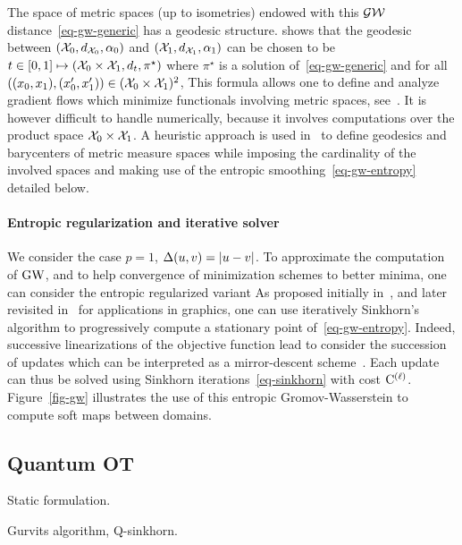 \begin{rem}
The space of metric spaces (up to isometries) endowed with this $\operatorname{\mathcal{GW}}$ distance~\eqref{eq-gw-generic} has a geodesic structure. \cite{SturmGW} shows that the geodesic between  $(\mathcal{X}_0,d_{\mathcal{X}_0},\alpha_0)$ and $(\mathcal{X}_1,d_{\mathcal{X}_1},\alpha_1)$ can be chosen to be 
$t \in [0,1] \mapsto (\mathcal{X}_0 \times \mathcal{X}_1,d_t,\pi^\star)$ where $\pi^\star$ is a solution of~\eqref{eq-gw-generic} and for all $((x_0,x_1), (x_0',x_1')) \in (\mathcal{X}_0 \times \mathcal{X}_1)^2$, 
This formula allows one to define and analyze gradient flows which minimize functionals involving metric spaces, see~\cite{SturmGW}. It is however difficult to handle numerically, because it involves computations over the product space $\mathcal{X}_0 \times \mathcal{X}_1$. 
%
A heuristic approach is used in~\cite{peyre2016gromov} to define geodesics and barycenters of metric measure spaces while imposing the cardinality of the involved spaces and making use of the entropic smoothing~\eqref{eq-gw-entropy} detailed below.
\end{rem}

\paragraph{Entropic regularization and iterative solver}

We consider the case $p=1$, $\Delta(u,v)=|u-v|$.
%
To approximate the computation of $\operatorname{\mathrm{GW}}$, and to help convergence of minimization schemes to better minima, one can consider the entropic regularized variant
As proposed initially in~\cite{gold-1996,rangarajan-1999}, and later revisited in~\cite{2016-solomon-gw} for applications in graphics, one can use iteratively Sinkhorn's algorithm to progressively compute a stationary point of~\eqref{eq-gw-entropy}. 
%
Indeed, successive linearizations of the objective function lead to consider the succession of updates
\eql{\label{eq-gw-sinkh}
	\itt{\P} \eqdef \umin{ \P \in \CouplingsD(\a,\b) } \dotp{\P}{\it{\C}} - \epsilon\H(\P)
		\qwhereq
}
which can be interpreted as a mirror-descent scheme~\cite{2016-solomon-gw}. Each update can thus be solved using Sinkhorn iterations~\eqref{eq-sinkhorn} with cost $\mathrm{C}^{(\ell)}$. Figure~\eqref{fig-gw} illustrates the use of this entropic Gromov-Wasserstein to compute soft maps between domains. 


\subsection{Quantum OT}

Static formulation.

Gurvits algorithm, Q-sinkhorn.
\fi